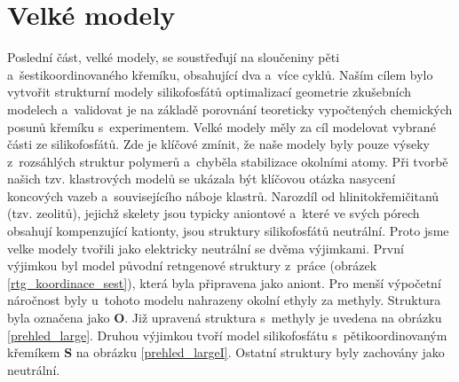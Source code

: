 \documentclass[
digital, %
table,   %
lof,     %
lot,     %
oneside,
]{fithesis3}
\begin{document}
\section{Velké modely}
Poslední část, velké modely, se soustřeďují na sloučeniny pěti a~šestikoordinovaného křemíku, obsahující dva a~více cyklů. Naším cílem bylo vytvořit strukturní modely silikofosfátů optimalizací geometrie zkušebních modelech a~validovat je na základě porovnání teoreticky vypočtených chemických posunů křemíku s~experimentem. Velké modely měly za cíl modelovat vybrané části ze silikofosfátů. Zde je klíčové zmínit, že naše modely byly pouze výseky z~rozsáhlých struktur polymerů a~chyběla stabilizace okolními atomy. Při tvorbě našich tzv. klastrových modelů se ukázala být klíčovou otázka nasycení koncových vazeb a~souvisejícího náboje klastrů. Narozdíl od hlinitokřemičitanů (tzv. zeolitů), jejichž skelety jsou typicky aniontové a~které ve svých pórech obsahují kompenzující kationty, jsou struktury silikofosfátů neutrální. Proto jsme velke modely tvořili jako elektricky neutrální se dvěma výjimkami. První výjimkou byl model původní retngenové struktury z~práce \cite{C3NJ00721A}(obrázek \ref{rtg_koordinace_sest}), která byla připravena jako aniont. Pro menší výpočetní náročnost byly u~tohoto modelu nahrazeny okolní ethyly za methyly. Struktura byla označena jako \textbf{O}. Již upravená struktura s~methyly je uvedena na obrázku \ref{prehled_large}. Druhou výjimkou tvoří model silikofosfátu s~pětikoordinovaným křemíkem \textbf{S} na obrázku \ref{prehled_largeI}. Ostatní struktury byly zachovány jako neutrální.
\end{document}
